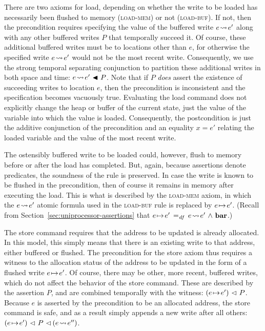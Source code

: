 \documentclass[11pt]{report}
\begin{document}
There are two axioms for load, depending on whether the write to be loaded has necessarily been flushed to memory (\textsc{load-mem}) or not (\textsc{load-buf}). If not, then the precondition requires specifying the value of the buffered write $e \!\leadsto\! e'$ along with any other buffered writes $P$ that temporally succeed it. Of course, these additional buffered writes must be to locations other than $e$, for otherwise the specified write $e \!\leadsto\! e'$ would not be the most recent write. Consequently, we use the strong temporal separating conjunction to partition these additional writes in both space and time: $e \!\leadsto\! e' \operatorname{\,\blacktriangleleft\,} P$. Note that if $P$ \emph{does} assert the existence of succeeding writes to location $e$, then the precondition is inconsistent and the specification becomes vacuously true. Evaluating the load command does not explicitly change the heap or buffer of the current state, just the value of the variable into which the value is loaded. Consequently, the postcondition is just the additive conjunction of the precondition and an equality $x = e'$ relating the loaded variable and the value of the most recent write. 

The ostensibly buffered write to be loaded could, however, flush to memory before or after the load has completed. But, again, because assertions denote predicates, the soundness of the rule is preserved. In case the write is known to be flushed in the precondition, then of course it remains in memory after executing the load. This is what is described by the \textsc{load-mem} axiom, in which the $e \!\leadsto\! e'$ atomic formula used in the \textsc{load-buf} rule is replaced by $e \!\mapsto\! e'$. (Recall from Section~\ref{sec:uniprocessor-assertions} that $e \!\mapsto\! e' \operatorname{\;=_{\mathit{df}}\;} e \!\leadsto\! e' \operatorname{\,\wedge\,} \mathbf{bar}$.) 

The store command requires that the address to be updated is already allocated. In this model, this simply means that there is an existing write to that address, either buffered or flushed. The precondition for the store axiom thus requires a witness to the allocation status of the address to be updated in the form of a flushed write $e \!\mapsto\! e'$. Of course, there may be other, more recent, buffered writes, which do not affect the behavior of the store command. These are described by the assertion $P$, and are combined temporally with the witness: $(e \!\mapsto\! e') \operatorname{\,\vartriangleleft\,} P$. Because $e$ is asserted by the precondition to be an allocated address, the store command is safe, and as a result simply appends a new write after all others: $(e \!\mapsto\! e') \operatorname{\,\vartriangleleft\,} P \operatorname{\,\vartriangleleft\,} (e \!\leadsto\! e'')$. 
\end{document}
